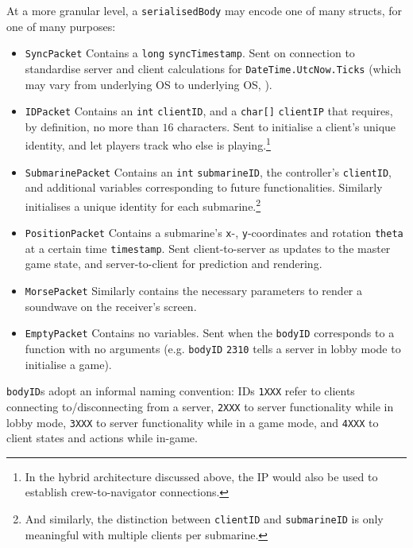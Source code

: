 \documentclass[a4paper, 9pt]{article}
\begin{document}
\begin{flushleft}
\vspace{5pt}\noindent
At a more granular level, a \texttt{serialisedBody} may encode one of many structs, for one of many purposes:
\begin{itemize}[noitemsep]
\item \texttt{SyncPacket} Contains a \texttt{long} \texttt{syncTimestamp}. Sent on connection to standardise server and client calculations for \texttt{DateTime.UtcNow.Ticks} (which may vary from underlying OS to underlying OS, \citealp{msftUTC}).
\item \texttt{IDPacket} Contains an \texttt{int} \texttt{clientID}, and a \texttt{char[]} \texttt{clientIP} that requires, by definition, no more than $16$ characters. Sent to initialise a client's unique identity, and let players track who else is playing.\footnote{In the hybrid architecture discussed above, the IP would also be used to establish crew-to-navigator connections.}
\item \texttt{SubmarinePacket} Contains an \texttt{int} \texttt{submarineID}, the controller's \texttt{clientID}, and additional variables corresponding to future functionalities. Similarly initialises a unique identity for each submarine.\footnote{And similarly, the distinction between \texttt{clientID} and \texttt{submarineID} is only meaningful with multiple clients per submarine.}
\item \texttt{PositionPacket} Contains a submarine's \texttt{x}-, \texttt{y}-coordinates and rotation \texttt{theta} at a certain time \texttt{timestamp}. Sent client-to-server as updates to the master game state, and server-to-client for prediction and rendering.
\item \texttt{MorsePacket} Similarly contains the necessary parameters to render a soundwave on the receiver's screen.
\item \texttt{EmptyPacket} Contains no variables. Sent when the \texttt{bodyID} corresponds to a function with no arguments (e.g. \texttt{bodyID} \texttt{2310} tells a server in lobby mode to initialise a game).
\end{itemize}
\texttt{bodyID}s adopt an informal naming convention: IDs \texttt{1XXX} refer to clients connecting to/disconnecting from a server, \texttt{2XXX} to server functionality while in lobby mode, \texttt{3XXX} to server functionality while in a game mode, and \texttt{4XXX} to client states and actions while in-game.


\end{flushleft}
\end{document}
